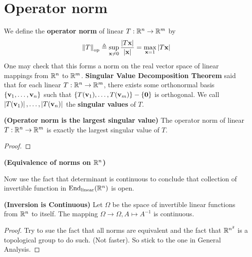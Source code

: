 \documentclass{report}
\begin{document}
\section{Operator norm}
We define the \textbf{operator norm} of linear $T: \mathbb{R}^n\rightarrow \mathbb{R}^m$ by 
\begin{align*}
\left\| T \right\|_{\operatorname{op}}\triangleq \sup_{\textbf{x}\neq 0} \frac{\left|T\textbf{x}\right|}{\left|\textbf{x}\right|}=  \max_{\textbf{x}=1} \left|T\textbf{x}\right|
\end{align*}
One may check that this forms a norm on the real vector space of linear mappings from $\mathbb{R}^n$ to  $\mathbb{R}^m$. \textbf{Singular Value Decomposition Theorem} said that for each linear $T :\mathbb{R}^n\rightarrow \mathbb{R}^m$, there exists some orthonormal basis $\left\{ \textbf{v}_1,\dots ,\textbf{v}_n \right\}$ such that $\left\{ T(\textbf{v}_1),\dots ,T(\textbf{v}_m) \right\}- \left\{ \textbf{0} \right\}$ is orthogonal. We call $\left|T(\textbf{v}_1)\right|,\dots ,\left|T(\textbf{v}_n)\right|$ the \textbf{singular values} of $T$. 
\begin{theorem}
\textbf{(Operator norm is the largest singular value)} The operator norm of linear $T:\mathbb{R}^n\rightarrow \mathbb{R}^m$ is exactly the largest singular value of $T$. 
\end{theorem}
\begin{proof}

\end{proof}
\begin{theorem}
\textbf{(Equivalence of norms on $\mathbb{R}^n$)}
\end{theorem}
Now use the fact that determinant is continuous to conclude that collection of invertible function in $\operatorname{End}_{\text{linear}}(\mathbb{R}^n)$ is open. 
\begin{theorem}
\textbf{(Inversion is Continuous)} Let $\Omega$ be the space of invertible linear functions from $\mathbb{R}^n$ to itself. The mapping $\Omega\rightarrow \Omega,A \mapsto  A^{-1}$ is continuous. 
\end{theorem}
\begin{proof}
Try to sue the fact that all norms are equivalent and the fact that $\mathbb{R}^{n^2}$ is a topological group to do such. (Not faster). So stick to the one in General Analysis. 
\end{proof}
\end{document}
